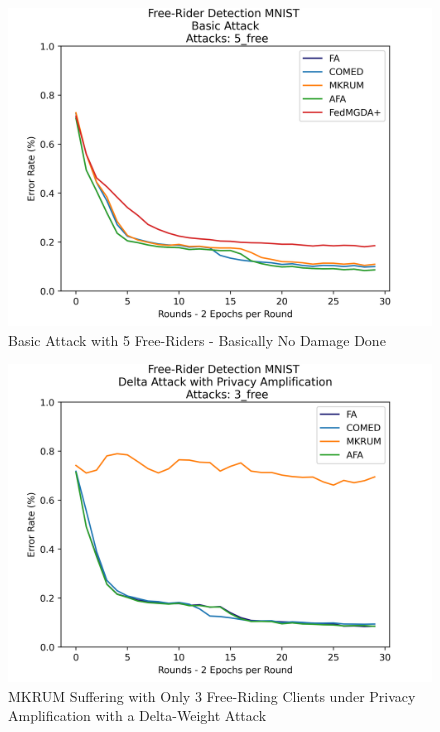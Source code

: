 \begin{figure}[htbp]
	\centering
    \includegraphics[scale=0.5]{free_riders/graphs/basic5.png}
	\caption{Basic Attack with 5 Free-Riders - Basically No Damage Done}
	\label{fig:5free}
\end{figure}

\begin{figure}[htbp]
	\centering
    \includegraphics[scale=0.5]{free_riders/graphs/mkrum_suffer.png}
	\caption{MKRUM Suffering with Only 3 Free-Riding Clients under Privacy Amplification with a Delta-Weight Attack}
	\label{fig:mkrum_suf}
\end{figure}

